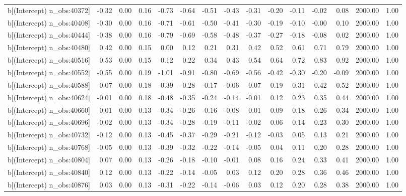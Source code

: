 \begin{table}[ht]
\begin{tabular}{rrrrrrrrrrrrrrr}
  b[(Intercept) n\_obs:40372] & -0.32 & 0.00 & 0.16 & -0.73 & -0.64 & -0.51 & -0.43 & -0.31 & -0.20 & -0.11 & -0.02 & 0.08 & 2000.00 & 1.00 \\ 
  b[(Intercept) n\_obs:40408] & -0.30 & 0.00 & 0.16 & -0.71 & -0.61 & -0.50 & -0.41 & -0.30 & -0.19 & -0.10 & -0.00 & 0.10 & 2000.00 & 1.00 \\ 
  b[(Intercept) n\_obs:40444] & -0.38 & 0.00 & 0.16 & -0.79 & -0.69 & -0.58 & -0.48 & -0.37 & -0.27 & -0.18 & -0.08 & 0.02 & 2000.00 & 1.00 \\ 
  b[(Intercept) n\_obs:40480] & 0.42 & 0.00 & 0.15 & 0.00 & 0.12 & 0.21 & 0.31 & 0.42 & 0.52 & 0.61 & 0.71 & 0.79 & 2000.00 & 1.00 \\ 
  b[(Intercept) n\_obs:40516] & 0.53 & 0.00 & 0.15 & 0.12 & 0.22 & 0.34 & 0.43 & 0.54 & 0.64 & 0.72 & 0.83 & 0.92 & 2000.00 & 1.00 \\ 
  b[(Intercept) n\_obs:40552] & -0.55 & 0.00 & 0.19 & -1.01 & -0.91 & -0.80 & -0.69 & -0.56 & -0.42 & -0.30 & -0.20 & -0.09 & 2000.00 & 1.00 \\ 
  b[(Intercept) n\_obs:40588] & 0.07 & 0.00 & 0.18 & -0.39 & -0.28 & -0.17 & -0.06 & 0.07 & 0.19 & 0.31 & 0.42 & 0.52 & 2000.00 & 1.00 \\ 
  b[(Intercept) n\_obs:40624] & -0.01 & 0.00 & 0.18 & -0.48 & -0.35 & -0.24 & -0.14 & -0.01 & 0.12 & 0.23 & 0.35 & 0.44 & 2000.00 & 1.00 \\ 
  b[(Intercept) n\_obs:40660] & 0.01 & 0.00 & 0.13 & -0.34 & -0.26 & -0.16 & -0.08 & 0.01 & 0.09 & 0.18 & 0.26 & 0.34 & 2000.00 & 1.00 \\ 
  b[(Intercept) n\_obs:40696] & -0.02 & 0.00 & 0.13 & -0.34 & -0.28 & -0.19 & -0.11 & -0.02 & 0.06 & 0.14 & 0.23 & 0.30 & 2000.00 & 1.00 \\ 
  b[(Intercept) n\_obs:40732] & -0.12 & 0.00 & 0.13 & -0.45 & -0.37 & -0.29 & -0.21 & -0.12 & -0.03 & 0.05 & 0.13 & 0.21 & 2000.00 & 1.00 \\ 
  b[(Intercept) n\_obs:40768] & -0.05 & 0.00 & 0.13 & -0.39 & -0.32 & -0.22 & -0.14 & -0.05 & 0.04 & 0.11 & 0.20 & 0.28 & 2000.00 & 1.00 \\ 
  b[(Intercept) n\_obs:40804] & 0.07 & 0.00 & 0.13 & -0.26 & -0.18 & -0.10 & -0.01 & 0.08 & 0.16 & 0.24 & 0.33 & 0.41 & 2000.00 & 1.00 \\ 
  b[(Intercept) n\_obs:40840] & 0.12 & 0.00 & 0.13 & -0.22 & -0.14 & -0.05 & 0.03 & 0.12 & 0.20 & 0.28 & 0.36 & 0.46 & 2000.00 & 1.00 \\ 
  b[(Intercept) n\_obs:40876] & 0.03 & 0.00 & 0.13 & -0.31 & -0.22 & -0.14 & -0.06 & 0.03 & 0.12 & 0.20 & 0.28 & 0.38 & 2000.00 & 1.00 \\ 

\end{tabular}
\end{table}
